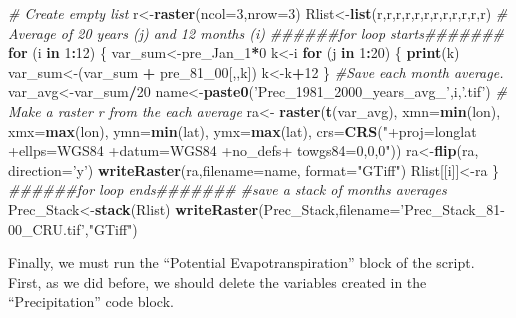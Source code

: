 \documentclass[
  10pt,
  b5paper,
]{book}
\newenvironment{Shaded}{\begin{snugshade}}{\end{snugshade}}
\newcommand{\CommentTok}[1]{\textcolor[rgb]{0.56,0.35,0.01}{\textit{#1}}}
\newcommand{\ControlFlowTok}[1]{\textcolor[rgb]{0.13,0.29,0.53}{\textbf{#1}}}
\newcommand{\DataTypeTok}[1]{\textcolor[rgb]{0.13,0.29,0.53}{#1}}
\newcommand{\DecValTok}[1]{\textcolor[rgb]{0.00,0.00,0.81}{#1}}
\newcommand{\KeywordTok}[1]{\textcolor[rgb]{0.13,0.29,0.53}{\textbf{#1}}}
\newcommand{\NormalTok}[1]{#1}
\newcommand{\OperatorTok}[1]{\textcolor[rgb]{0.81,0.36,0.00}{\textbf{#1}}}
\newcommand{\StringTok}[1]{\textcolor[rgb]{0.31,0.60,0.02}{#1}}
\begin{document}
\begin{Shaded}
\begin{Highlighting}[]
 \CommentTok{# Create empty list}
\NormalTok{r<-}\KeywordTok{raster}\NormalTok{(}\DataTypeTok{ncol=}\DecValTok{3}\NormalTok{,}\DataTypeTok{nrow=}\DecValTok{3}\NormalTok{)}
\NormalTok{Rlist<-}\KeywordTok{list}\NormalTok{(r,r,r,r,r,r,r,r,r,r,r,r)}
 \CommentTok{# Average of 20 years (j)  and 12 months (i) }
\CommentTok{######for loop starts#######}
 \ControlFlowTok{for}\NormalTok{ (i }\ControlFlowTok{in} \DecValTok{1}\OperatorTok{:}\DecValTok{12}\NormalTok{) \{ }
\NormalTok{var_sum<-pre_Jan_}\DecValTok{1}\OperatorTok{*}\DecValTok{0}
\NormalTok{k<-i}
 \ControlFlowTok{for}\NormalTok{ (j }\ControlFlowTok{in} \DecValTok{1}\OperatorTok{:}\DecValTok{20}\NormalTok{) \{}
\KeywordTok{print}\NormalTok{(k)}
\NormalTok{var_sum<-(var_sum }\OperatorTok{+}\StringTok{ }\NormalTok{pre_}\DecValTok{81}\NormalTok{_}\DecValTok{00}\NormalTok{[,,k])}
\NormalTok{ k<-k}\OperatorTok{+}\DecValTok{12}
\NormalTok{ \}}
\CommentTok{#Save each month average. }
\NormalTok{ var_avg<-var_sum}\OperatorTok{/}\DecValTok{20}
\NormalTok{name<-}\KeywordTok{paste0}\NormalTok{(}\StringTok{'Prec_1981_2000_years_avg_'}\NormalTok{,i,}\StringTok{'.tif'}\NormalTok{)}
 \CommentTok{# Make a raster r from the each average}
\NormalTok{ra<-}\StringTok{ }\KeywordTok{raster}\NormalTok{(}\KeywordTok{t}\NormalTok{(var_avg), }\DataTypeTok{xmn=}\KeywordTok{min}\NormalTok{(lon), }\DataTypeTok{xmx=}\KeywordTok{max}\NormalTok{(lon), }\DataTypeTok{ymn=}\KeywordTok{min}\NormalTok{(lat), }\DataTypeTok{ymx=}\KeywordTok{max}\NormalTok{(lat), }\DataTypeTok{crs=}\KeywordTok{CRS}\NormalTok{(}\StringTok{"+proj=longlat +ellps=WGS84 +datum=WGS84 +no_defs+ towgs84=0,0,0"}\NormalTok{))}
\NormalTok{ra<-}\KeywordTok{flip}\NormalTok{(ra, }\DataTypeTok{direction=}\StringTok{'y'}\NormalTok{)}
\KeywordTok{writeRaster}\NormalTok{(ra,}\DataTypeTok{filename=}\NormalTok{name, }\DataTypeTok{format=}\StringTok{"GTiff"}\NormalTok{)}
\NormalTok{Rlist[[i]]<-ra}
\NormalTok{\}}
\CommentTok{######for loop ends#######}
 \CommentTok{#save a stack of months averages}
\NormalTok{Prec_Stack<-}\KeywordTok{stack}\NormalTok{(Rlist)}
\KeywordTok{writeRaster}\NormalTok{(Prec_Stack,}\DataTypeTok{filename=}\StringTok{'Prec_Stack_81-00_CRU.tif'}\NormalTok{,}\StringTok{"GTiff"}\NormalTok{)}
\end{Highlighting}
\end{Shaded}

Finally, we must run the ``Potential Evapotranspiration'' block of the script. First, as we did before, we should delete the variables created in the ``Precipitation'' code block.
\end{document}
